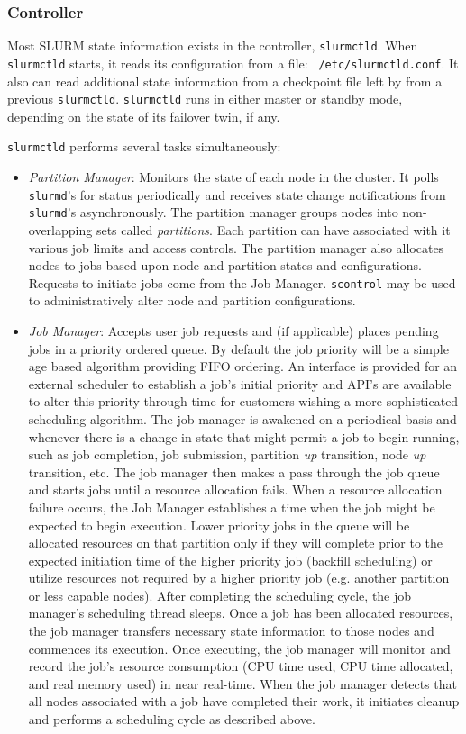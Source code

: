 \subsubsection{Controller}

Most SLURM state information exists in the controller, {\tt slurmctld}.
When {\tt slurmctld} starts, it reads its configuration from a file: {\tt
/etc/slurmctld.conf}.  It also can read additional state information
from a checkpoint file left by from a previous {\tt slurmctld}.
{\tt slurmctld} runs in either master or standby mode, depending on the
state of its failover twin, if any.

{\tt slurmctld} performs several tasks simultaneously:

\begin{itemize}
\item {\em Partition Manager}: Monitors the state of each node in
the cluster.  It polls {\tt slurmd}'s for status periodically and
receives state change notifications from {\tt slurmd}'s asynchronously.
The partition manager groups nodes into non-overlapping sets called
{\em partitions}. Each partition can have associated with it various job
limits and access controls.  The partition manager also allocates nodes
to jobs based upon node and partition states and configurations. Requests
to initiate jobs come from the Job Manager.  {\tt scontrol} may be used
to administratively alter node and partition configurations.

\item {\em Job Manager}: Accepts user job requests and (if applicable)
places pending jobs in a priority ordered queue. By default the job
priority will be a simple age based algorithm providing FIFO ordering.
An interface is provided for an external scheduler to establish a job's
initial priority and API's are available to alter this priority through
time for customers wishing a more sophisticated scheduling algorithm.
The job manager is awakened on a periodical basis and whenever there
is a change in state that might permit a job to begin running, such
as job completion, job submission, partition {\em up} transition,
node {\em up} transition, etc.  The job manager then makes a pass
through the job queue and starts jobs until a resource allocation fails.
When a resource allocation failure occurs, the Job Manager establishes a
time when the job might be expected to begin execution.  Lower priority
jobs in the queue will be allocated resources on that partition only if
they will complete prior to the expected initiation time of the higher
priority job (backfill scheduling) or utilize resources not required by
a higher priority job (e.g. another partition or less capable nodes).
After completing the scheduling cycle, the job manager's scheduling
thread sleeps.  Once a job has been allocated resources, the job manager
transfers necessary state information to those nodes and commences
its execution.  Once executing, the job manager will monitor and record
the job's resource consumption (CPU time used, CPU time allocated, and
real memory used) in near real-time.  When the job manager detects that
all nodes associated with a job have completed their work, it initiates
cleanup and performs a scheduling cycle as described above.


\end{itemize}
